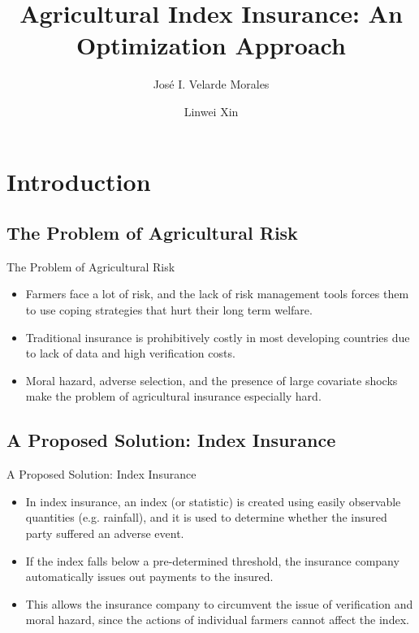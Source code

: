 \documentclass{beamer}
\title[Agricultural Index Insurance]{Agricultural Index Insurance: An Optimization Approach}
\author[José Velarde Morales]{José I. Velarde Morales \and Linwei Xin}
\institute[Chicago Booth]
{

  University of Chicago\\
  Booth School of Business

}
\begin{document}
\beamertemplatenavigationsymbolsempty
\frame{\titlepage}
\section{Introduction}

\subsection{The Problem of Agricultural Risk}
\begin{frame}{The Problem of Agricultural Risk}
\begin{itemize}
    \setlength\itemsep{2em}
    \item Farmers face a lot of risk, and the lack of risk management tools forces them to use coping strategies that hurt their long term welfare.
   
    \item Traditional insurance is prohibitively costly in most developing countries due to lack of data and high verification costs.

    \item Moral hazard, adverse selection, and the presence of large covariate shocks make the problem of agricultural insurance especially hard. 
\end{itemize}
\end{frame}

\subsection{A Proposed Solution: Index Insurance}
\begin{frame}{A Proposed Solution: Index Insurance}
\begin{itemize}
   \setlength\itemsep{1em}
    \item In index insurance, an index (or statistic) is created using easily observable quantities (e.g. rainfall), and it is used to determine whether the insured party suffered an adverse event. 
    \item If the index falls below a pre-determined threshold, the insurance company automatically issues out payments to the insured. 
    \item This allows the insurance company to circumvent the issue of verification and moral hazard, since the actions of individual farmers cannot affect the index.
\end{itemize}
\end{frame}
\end{document}
